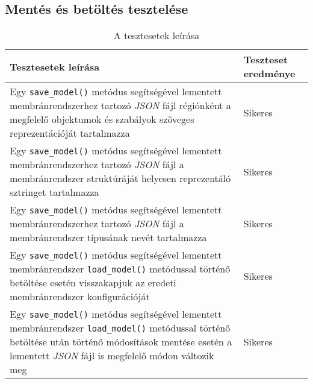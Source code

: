 \subsection{Mentés és betöltés tesztelése}
\begin{table}[H]
	\centering
	\begin{tabular}{ | m{} | m{} | }
		\hline
		\textbf{Tesztesetek leírása} & \textbf{Teszteset eredménye} \\
		\hline \hline
		Egy \verb|save_model()| metódus segítségével lementett membránrendszerhez tartozó \textit{JSON} fájl régiónként a megfelelő objektumok és szabályok szöveges reprezentációját tartalmazza & Sikeres \\
		\hline
		Egy \verb|save_model()| metódus segítségével lementett membránrendszerhez tartozó \textit{JSON} fájl a membránrendszer struktúráját helyesen reprezentáló sztringet tartalmazza  & Sikeres \\
		\hline
		Egy \verb|save_model()| metódus segítségével lementett membránrendszerhez tartozó \textit{JSON} fájl a membránrendszer típusának nevét tartalmazza & Sikeres \\
		\hline
			Egy \verb|save_model()| metódus segítségével lementett membránrendszer \verb|load_model()| metódussal történő betöltése esetén visszakapjuk az eredeti membránrendszer konfigurációját & Sikeres \\
		\hline
		Egy \verb|save_model()| metódus segítségével lementett membránrendszer \verb|load_model()| metódussal történő betöltése után történő módosítások mentése esetén a lementett \textit{JSON} fájl is megfelelő módon változik meg & Sikeres \\
		\hline
	\end{tabular}
	\caption{A tesztesetek leírása}
	\label{tab:test_cases_save_and_load}
\end{table}